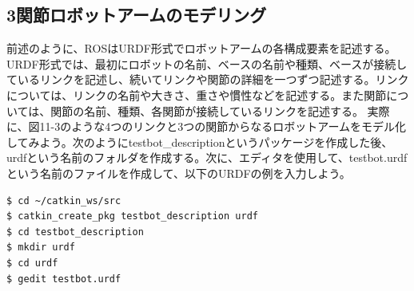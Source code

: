 \subsection{3関節ロボットアームのモデリング}
前述のように、ROSはURDF形式でロボットアームの各構成要素を記述する。URDF形式では、最初にロボットの名前、ベースの名前や種類、ベースが接続しているリンクを記述し、続いてリンクや関節の詳細を一つずつ記述する。リンクについては、リンクの名前や大きさ、重さや慣性などを記述する。また関節については、関節の名前、種類、各関節が接続しているリンクを記述する。
実際に、図11-3のような4つのリンクと3つの関節からなるロボットアームをモデル化してみよう。次のようにtestbot\_descriptionというパッケージを作成した後、urdfという名前のフォルダを作成する。次に、エディタを使用して、testbot.urdfという名前のファイルを作成して、以下のURDFの例を入力しよう。

\begin{lstlisting}[language=ROS]
$ cd ~/catkin_ws/src
$ catkin_create_pkg testbot_description urdf
$ cd testbot_description
$ mkdir urdf
$ cd urdf
$ gedit testbot.urdf
\end{lstlisting}

